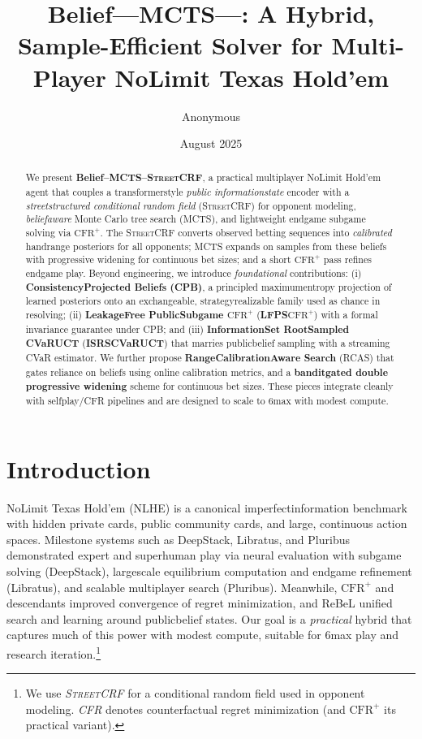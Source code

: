 \documentclass[10pt]{article}
\title{Belief---MCTS---\sCRF: A Hybrid, Sample-Efficient Solver for Multi-Player No\textendash Limit Texas Hold'em}
\author{Anonymous}
\date{August 2025}
\newcommand{\sCRF}{\textsc{Street\textendash CRF}\xspace} %
\newcommand{\CFRplus}{\ensuremath{\mathrm{CFR}^{+}}\xspace}
\newcommand{\1}{\mathbf{1}}
\theoremstyle{plain}
\begin{document}
\maketitle

\begin{abstract}
We present \textbf{Belief--MCTS--\sCRF}, a practical multi\textendash player No\textendash Limit Hold'em agent that couples a transformer\textendash style \emph{public information\textendash state} encoder with a \emph{street\textendash structured conditional random field} (\sCRF) for opponent modeling, \emph{belief\textendash aware} Monte Carlo tree search (MCTS), and lightweight endgame subgame solving via \CFRplus. The \sCRF converts observed betting sequences into \emph{calibrated} hand\textendash range posteriors for all opponents; MCTS expands on samples from these beliefs with progressive widening for continuous bet sizes; and a short \CFRplus pass refines endgame play.
Beyond engineering, we introduce \emph{foundational} contributions: (i) \textbf{Consistency\textendash Projected Beliefs (CPB)}, a principled maximum\textendash entropy projection of learned posteriors onto an exchangeable, strategy\textendash realizable family used as chance in re\textendash solving; (ii) \textbf{Leakage\textendash Free Public\textendash Subgame \CFRplus} (\textbf{LF\textendash PS\textendash \CFRplus}) with a formal invariance guarantee under CPB; and (iii) \textbf{Information\textendash Set Root\textendash Sampled CVaR\textendash UCT} (\textbf{IS\textendash RS\textendash CVaR\textendash UCT}) that marries public\textendash belief sampling with a streaming CVaR estimator. We further propose \textbf{Range\textendash Calibration\textendash Aware Search} (RCAS) that gates reliance on beliefs using online calibration metrics, and a \textbf{bandit\textendash gated double progressive widening} scheme for continuous bet sizes. These pieces integrate cleanly with self\textendash play/CFR pipelines and are designed to scale to 6\textendash max with modest compute.
\end{abstract}

\section{Introduction}
No\textendash Limit Texas Hold'em (NLHE) is a canonical imperfect\textendash information benchmark with hidden private cards, public community cards, and large, continuous action spaces. Milestone systems such as DeepStack, Libratus, and Pluribus demonstrated expert and superhuman play via neural evaluation with subgame solving (DeepStack), large\textendash scale equilibrium computation and endgame refinement (Libratus), and scalable multi\textendash player search (Pluribus). Meanwhile, \CFRplus and descendants improved convergence of regret minimization, and ReBeL unified search and learning around public\textendash belief states. Our goal is a \emph{practical} hybrid that captures much of this power with modest compute, suitable for 6\textendash max play and research iteration.\footnote{We use \emph{\sCRF} for a conditional random field used in opponent modeling. \emph{CFR} denotes counterfactual regret minimization (and \CFRplus its practical variant).}
\end{document}
